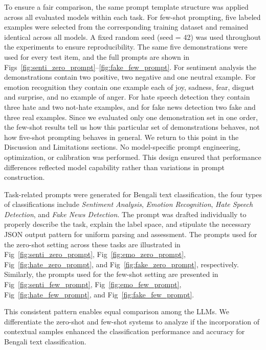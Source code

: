 \documentclass[10pt,letterpaper]{article}
\begin{document}
To ensure a fair comparison, the same prompt template structure was applied across all evaluated models within each task. For few-shot prompting, five labeled examples were selected from the corresponding training dataset and remained identical across all models. A fixed random seed (seed = 42) was used throughout the experiments to ensure reproducibility. The same five demonstrations were used for every test item, and the full prompts are shown in Figs~\ref{fig:senti_zero_prompt}--\ref{fig:fake_few_prompt}. For sentiment analysis the demonstrations contain two positive, two negative and one neutral example. For emotion recognition they contain one example each of joy, sadness, fear, disgust and surprise, and no example of anger. For hate speech detection they contain three hate and two not-hate examples, and for fake news detection two fake and three real examples. Since we evaluated only one demonstration set in one order, the few-shot results tell us how this particular set of demonstrations behaves, not how five-shot prompting behaves in general. We return to this point in the Discussion and Limitations sections. No model-specific prompt engineering, optimization, or calibration was performed. This design ensured that performance differences reflected model capability rather than variations in prompt construction.



Task-related prompts were generated for Bengali text classification, the four types of classifications include \textit{Sentiment Analysis}, \textit{Emotion Recognition}, \textit{Hate Speech Detection}, and \textit{Fake News Detection}. 
The prompt was drafted individually to properly describe the task, explain the label space, and stipulate the necessary JSON output pattern for uniform parsing and assessment.
The prompts used for the zero-shot setting across these tasks are illustrated in Fig~\ref{fig:senti_zero_prompt}, Fig~\ref{fig:emo_zero_prompt}, Fig~\ref{fig:hate_zero_prompt}, and Fig~\ref{fig:fake_zero_prompt}, respectively. Similarly, the prompts used for the few-shot setting are presented in Fig~\ref{fig:senti_few_prompt}, Fig~\ref{fig:emo_few_prompt}, Fig~\ref{fig:hate_few_prompt}, and Fig~\ref{fig:fake_few_prompt}.

This consistent pattern enables equal comparison among the LLMs. 
We differentiate the zero-shot and few-shot systems to analyze if the incorporation of contextual samples enhanced the classification performance and accuracy for Bengali text classification. 
\end{document}

